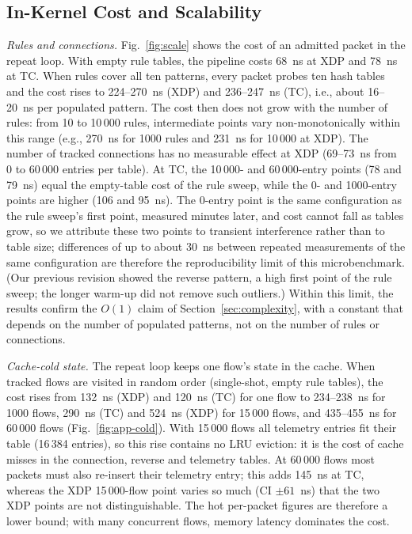 \documentclass[conference]{IEEEtran}
\begin{document}
\subsection{In-Kernel Cost and Scalability}
\label{sec:kernel-cost}
\textit{Rules and connections.} Fig.~\ref{fig:scale} shows the cost of an
admitted packet in the repeat loop. With empty rule tables, the pipeline costs
68~ns at XDP and 78~ns at TC. When rules cover all ten patterns, every packet
probes ten hash tables and the cost rises to 224--270~ns (XDP) and
236--247~ns (TC), i.e., about 16--20~ns per populated pattern. The cost then
does not grow with the number of rules: from 10 to 10\,000 rules,
intermediate points vary non-monotonically within this range (e.g., 270~ns
for 1000 rules and 231~ns for 10\,000 at XDP). The number of tracked
connections has no measurable effect at XDP (69--73~ns from 0 to 60\,000
entries per table). At TC, the 10\,000- and 60\,000-entry points (78 and
79~ns) equal the empty-table cost of the rule sweep, while the 0- and
1000-entry points are higher (106 and 95~ns). The 0-entry point is the same
configuration as the rule sweep's first point, measured minutes later, and
cost cannot fall as tables grow, so we attribute these two points to
transient interference rather than to table size; differences of up to
about 30~ns between repeated measurements of the same configuration are
therefore the reproducibility limit of this microbenchmark. (Our previous
revision showed the reverse pattern, a high first point of the rule sweep;
the longer warm-up did not remove such outliers.) Within this limit, the
results confirm the $O(1)$ claim of Section~\ref{sec:complexity}, with a
constant that depends on the number of populated patterns, not on the number
of rules or connections.

\textit{Cache-cold state.} The repeat loop keeps one flow's state in the
cache. When tracked flows are visited in random order (single-shot, empty
rule tables), the cost rises from 132~ns (XDP) and 120~ns (TC) for one flow to
234--238~ns for 1000 flows, 290~ns (TC) and 524~ns (XDP) for 15\,000 flows,
and 435--455~ns for 60\,000 flows (Fig.~\ref{fig:app-cold}). With 15\,000
flows all telemetry entries fit their table (16\,384 entries), so this rise
contains no LRU eviction: it is the cost of cache misses in the connection,
reverse and telemetry tables. At 60\,000 flows most packets must also
re-insert their telemetry entry; this adds 145~ns at TC, whereas the XDP
15\,000-flow point varies so much (CI $\pm61$~ns) that the two XDP points are
not distinguishable. The hot per-packet figures are therefore a lower bound;
with many concurrent flows, memory latency dominates the cost.
\end{document}
